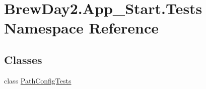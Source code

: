 \hypertarget{namespace_brew_day2_1_1_app___start_1_1_tests}{}\section{Brew\+Day2.\+App\+\_\+\+Start.\+Tests Namespace Reference}
\label{namespace_brew_day2_1_1_app___start_1_1_tests}
\subsection*{Classes}
\begin{DoxyCompactItemize}
\item 
class \mbox{\hyperlink{class_brew_day2_1_1_app___start_1_1_tests_1_1_path_config_tests}{Path\+Config\+Tests}}
\end{DoxyCompactItemize}
